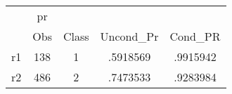 \begin{tabular}{l*{4}{c}}
\hline\hline
            &          pr&            &            &            \\
            &         Obs&       Class&   Uncond\_Pr&     Cond\_PR\\
\hline
r1          &         138&           1&    .5918569&    .9915942\\
r2          &         486&           2&    .7473533&    .9283984\\
\hline\hline
\end{tabular}
